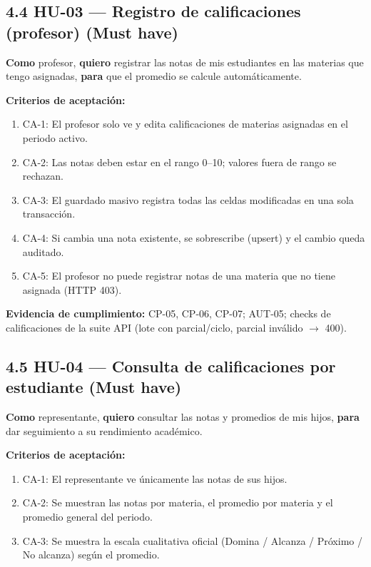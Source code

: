 \documentclass[11pt,a4paper]{article}
\begin{document}
\subsection*{4.4 HU-03 --- Registro de calificaciones (profesor) \textbf{(Must have)}}


\textbf{Como} profesor, \textbf{quiero} registrar las notas de mis estudiantes en las materias que tengo asignadas, \textbf{para} que el promedio se calcule automáticamente.


\textbf{Criterios de aceptación:}


\begin{enumerate}[leftmargin=*]
\item CA-1: El profesor solo ve y edita calificaciones de materias asignadas en el periodo activo.
\item CA-2: Las notas deben estar en el rango 0--10; valores fuera de rango se rechazan.
\item CA-3: El guardado masivo registra todas las celdas modificadas en una sola transacción.
\item CA-4: Si cambia una nota existente, se sobrescribe (upsert) y el cambio queda auditado.
\item CA-5: El profesor no puede registrar notas de una materia que no tiene asignada (HTTP 403).
\end{enumerate}


\textbf{Evidencia de cumplimiento:} CP-05, CP-06, CP-07; AUT-05; checks de calificaciones de la suite API (lote con parcial/ciclo, parcial inválido {$\rightarrow$} 400).


\subsection*{4.5 HU-04 --- Consulta de calificaciones por estudiante \textbf{(Must have)}}


\textbf{Como} representante, \textbf{quiero} consultar las notas y promedios de mis hijos, \textbf{para} dar seguimiento a su rendimiento académico.


\textbf{Criterios de aceptación:}


\begin{enumerate}[leftmargin=*]
\item CA-1: El representante ve únicamente las notas de sus hijos.
\item CA-2: Se muestran las notas por materia, el promedio por materia y el promedio general del periodo.
\item CA-3: Se muestra la escala cualitativa oficial (Domina / Alcanza / Próximo / No alcanza) según el promedio.
\end{enumerate}
\end{document}
